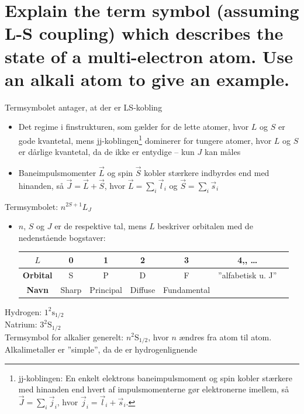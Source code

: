 \section{Explain the term symbol (assuming L-S coupling) which describes the state of a multi-electron atom. Use an alkali atom to give an example.}

\noindent
\large
Termsymbolet antager, at der er LS-kobling
\begin{itemize}
    \item Det regime i finstrukturen, som gælder for de lette atomer, hvor $L$ og $S$ er gode kvantetal, mens jj-koblingen\footnote{jj-koblingen: En enkelt elektrons baneimpulsmoment og spin kobler stærkere med hinanden end hvert af impulsmomenterne gør elektronerne imellem, så $\Vec{J} = \sum_i \Vec{j}_i$, hvor $\Vec{j}_i = \Vec{l}_i + \Vec{s}_i$.} dominerer for tungere atomer, hvor $L$ og $S$ er dårlige kvantetal, da de ikke er entydige -- kun $J$ kan måles
    \item Baneimpulsmomenter $\Vec{L}$ og spin $\Vec{S}$ kobler stærkere indbyrdes end med hinanden, så $\Vec{J} = \Vec{L} + \Vec{S}$, hvor $\Vec{L} = \sum_i \Vec{l}_i$ og $\Vec{S} = \sum_i \Vec{s}_i$
\end{itemize}
Termsymbolet: $n^{2S+1}L_J$
\begin{itemize}
    \item $n$, $S$ og $J$ er de respektive tal, mens $L$ beskriver orbitalen med de nedenstående bogstaver:\\
    \begin{tabular}{|c|c|c|c|c|c|c|}
        \hline
        $L$ & 0 & 1 & 2 & 3 & 4,\: 5,\: \ldots\\
        \hline
        \textbf{Orbital} & S & P & D & F & ''alfabetisk u. J'' \\
        \hline
        \textbf{Navn} & Sharp & Principal & Diffuse & Fundamental & \\
        \hline
    \end{tabular}
\end{itemize}
Hydrogen: $1^2\text{s}_{1/2}$\\
Natrium: $3^2\text{S}_{1/2}$\\
Termsymbol for alkalier generelt: $n^2\text{S}_{1/2}$, hvor $n$ ændres fra atom til atom.\\
Alkalimetaller er ''simple'', da de er hydrogenlignende
